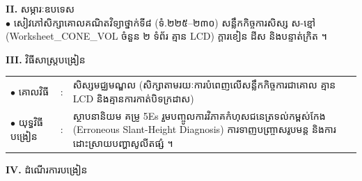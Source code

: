\documentclass[a4paper,10pt]{article}
\newcommand{\en}[1]{{\TimesEn #1}}
\begin{document}
{%
\textbf{II.} {\muol សម្ភារៈឧបទេស}\\[1pt]
\hspace*{0.55cm}$\bullet$ \hspace{0.35cm} សៀវភៅសិក្សាគោលគណិតវិទ្យាថ្នាក់ទី៨ (ទំ.២២៥--២៣០) សន្លឹកកិច្ចការសិស្ស ស-ខ្មៅ (\en{Worksheet\_CONE\_VOL} ចំនួន ២ ទំព័រ គ្មាន \en{LCD}) ក្ដារខៀន ដីស និងបន្ទាត់ក្រិត ។

\vspace{3pt}

\textbf{III.} {\muol វិធីសាស្រ្តបង្រៀន}\\[1pt]
\hspace*{0.45cm}%
\begin{tabular}{@{}l l L{14.85cm}@{}}
  $\bullet$ \hspace{0.25cm} គោលវិធី & : & សិស្សមជ្ឈមណ្ឌល (សិក្សាតាមរយៈការបំពេញលើសន្លឹកកិច្ចការជាគោល គ្មាន \en{LCD} និងគ្មានការកាត់បិទក្រដាស) \\
  $\bullet$ \hspace{0.25cm} យុទ្ធវិធីបង្រៀន & : & ស្ថាបនានិយម គម្រូ \en{5Es} រួមបញ្ចូលការវិភាគកំហុសជនេត្រទល់កម្ពស់កែង (\en{Erroneous Slant-Height Diagnosis}) ការទាញបញ្ច្រាសរូបមន្ត និងការដោះស្រាយបញ្ហាសូលីតផ្សំ ។ \\
\end{tabular}
}

\vspace{3pt}

\textbf{IV.} {\muol ដំណើរការបង្រៀន}

\vspace{2pt}
\end{document}

